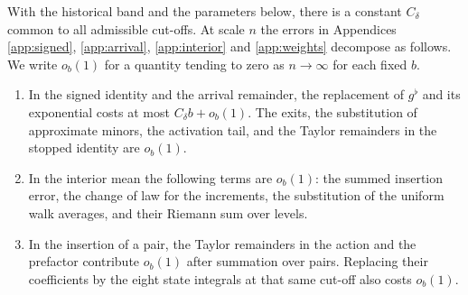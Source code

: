 \begin{proposicion}\label{prop:cortes-uniformes}
With the historical band and the parameters below, there is a constant \(C_\delta\) common to all
admissible cut-offs. At scale \(n\) the errors in Appendices \ref{app:signed}, \ref{app:arrival},
\ref{app:interior} and \ref{app:weights} decompose as follows. We write \(o_b(1)\) for a quantity tending
to zero as \(n\to\infty\) for each fixed \(b\).
\begin{enumerate}
\item In the signed identity and the arrival remainder, the replacement of \(g^\flat\) and its
exponential costs at most \(C_\delta b+o_b(1)\). The exits, the substitution of approximate minors, the
activation tail, and the Taylor remainders in the stopped identity are \(o_b(1)\).
\item In the interior mean the following terms are \(o_b(1)\): the summed insertion error, the change of
law for the increments, the substitution of the uniform walk averages, and their Riemann sum over levels.
\item In the insertion of a pair, the Taylor remainders in the action and the prefactor contribute
\(o_b(1)\) after summation over pairs. Replacing their coefficients by the eight state integrals at that
same cut-off also costs \(o_b(1)\).
\end{enumerate}
\end{proposicion}
